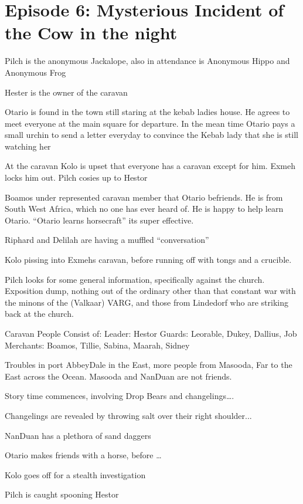 \section{Episode 6: Mysterious Incident of the Cow in the night}

Pilch is the anonymous Jackalope, also in attendance is Anonymous Hippo and Anonymous Frog    

Hester is the owner of the caravan    

Otario is found in the town still staring at the kebab ladies house. He agrees to meet everyone at the main square for departure. In the mean time Otario pays a small urchin to send a letter everyday to convince the Kebab lady that she is still watching her    

At the caravan Kolo is upset that everyone has a caravan except for him. Exmeh locks him out. Pilch cosies up to Hestor    

Boamos under represented caravan member that Otario befriends. He is from South West Africa, which no one has ever heard of. He is happy to help learn Otario. “Otario learns horsecraft” its super effective.    

Riphard and Delilah are having a muffled “conversation”    

Kolo pissing into Exmehs caravan, before running off with tongs and a crucible.     

Pilch looks for some general information, specifically against the church. Exposition dump, nothing out of the ordinary other than that constant war with the minons of the (Valkaar) VARG, and those from Lindedorf who are striking back at the church.    

Caravan People Consist of:    
Leader: Hestor    
Guards: Leorable, Dukey, Dallius, Job   
Merchants: Boamos, Tillie, Sabina, Maarah, Sidney      

Troubles in port AbbeyDale in the East, more people from Masooda, Far to the East across the Ocean. Masooda and NanDuan are not friends.    

Story time commences, involving Drop Bears and changelings….    

Changelings are revealed by throwing salt over their right shoulder...


NanDuan has a plethora of sand daggers    

Otario makes friends with a horse, before …    

Kolo goes off for a stealth investigation    

Pilch is caught spooning Hestor    

